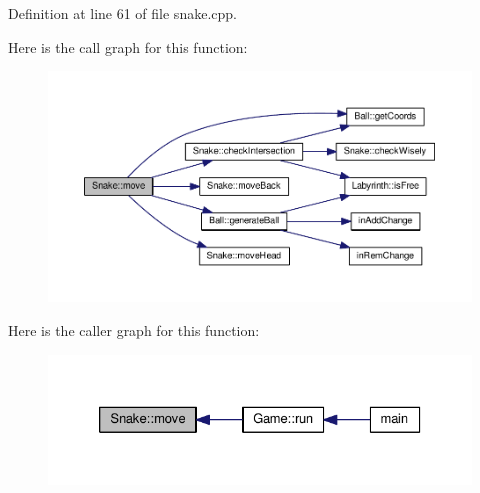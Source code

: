 Definition at line 61 of file snake.\-cpp.



Here is the call graph for this function\-:
\nopagebreak
\begin{figure}[H]
\begin{center}
\leavevmode
\includegraphics[width=350pt]{class_snake_a6181d41b0920aff3fda1a90d59e8d382_cgraph}
\end{center}
\end{figure}




Here is the caller graph for this function\-:
\nopagebreak
\begin{figure}[H]
\begin{center}
\leavevmode
\includegraphics[width=326pt]{class_snake_a6181d41b0920aff3fda1a90d59e8d382_icgraph}
\end{center}
\end{figure}


